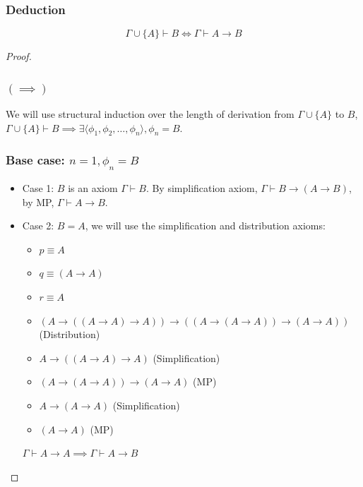 \documentclass{article}
\newtheorem{theorem}{Theorem}[section]
\let\oldtheorem\theorem
\let\endoldtheorem\endtheorem
\renewenvironment{theorem}
  {\begin{tcolorbox}[
      colback=yellow!6,
      colframe=yellow!60!black,
      boxrule=0.6pt,
      arc=2pt,
      left=6pt,right=6pt,top=4pt,bottom=4pt,
      parbox=false
    ]\oldtheorem}
  {\endoldtheorem\end{tcolorbox}}
\begin{document}
\subsubsection{Deduction}
\begin{theorem}
\[\Gamma \cup \{A\} \vdash B \iff \Gamma \vdash A \rightarrow B\]
\end{theorem}
\begin{proof}
    \subsubsection*{$(\implies)$}
    We will use structural induction over the length of derivation from $\Gamma \cup \{A\}$ to $B$, 
    $\Gamma \cup \{A\} \vdash B \implies \exists \langle \phi_1, \phi_2, \dots, \phi_n\rangle, \phi_n = B$.
    \subsubsection*{Base case: $n = 1, \phi_n = B$}
    \begin{itemize}
        \item Case 1: $B$ is an axiom $\Gamma \vdash B$. By simplification axiom, $\Gamma \vdash B \rightarrow (A \rightarrow B)$, by MP, $\Gamma \vdash A\rightarrow B$.
        \item Case 2: $B = A$, we will use the simplification and distribution axioms:
        \begin{itemize}
            \item $p \equiv A$
            \item $q \equiv (A\rightarrow A)$
            \item $r \equiv A$
        \end{itemize}
        \begin{itemize} 
            \item $(A\rightarrow ((A \rightarrow A)\rightarrow A)) \rightarrow ((A\rightarrow (A \rightarrow A))\rightarrow (A \rightarrow A))$ (Distribution)
            \item $A\rightarrow((A\rightarrow A)\rightarrow A)$ (Simplification)
            \item $(A\rightarrow(A\rightarrow A)) \rightarrow(A \rightarrow A)$ (MP)
            \item $A \rightarrow(A \rightarrow A)$ (Simplification)
            \item $(A \rightarrow A)$ (MP)
        \end{itemize}
        $\Gamma \vdash A \rightarrow A \implies \Gamma \vdash A \rightarrow B$
    \end{itemize}

\end{proof}
\end{document}
